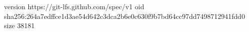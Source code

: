 version https://git-lfs.github.com/spec/v1
oid sha256:264a7edffce1d3ae54d642c3dca2b6e0c630f9b7bd64cc97dd7498712941fdd0
size 38181
